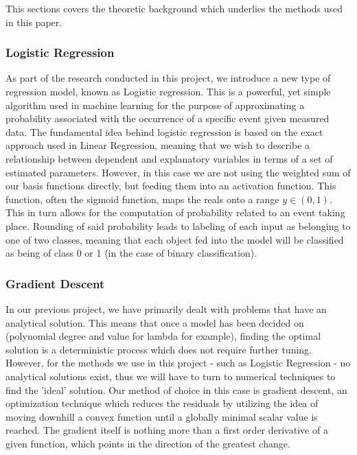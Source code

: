\documentclass[onecolumn,10pt,cleanfoot]{asme2ej}
\begin{document}
This sections covers the theoretic background which underlies the methods used in this paper.

\subsubsection{Logistic Regression}

As part of the research conducted in this project, we introduce a new type of regression model, known as Logistic regression. This is a powerful, yet simple algorithm used in machine learning for the purpose of approximating a probability associated with the occurrence of a specific event given measured data. The fundamental idea behind logistic regression is based on the exact approach used in Linear Regression, meaning that we wish to describe a relationship between dependent and explanatory variables in terms of a set of estimated parameters. However, in this case we are not using the weighted sum of our basis functions directly, but feeding them into an activation function. This function, often the sigmoid function, maps the reals onto a range $y \in (0,1)$. This in turn allows for the computation of probability related to an event taking place. Rounding of said probability leads to labeling of each input as belonging to one of two classes, meaning that each object fed into the model will be classified as being of class 0 or 1 (in the case of binary classification).

 

\subsubsection{Gradient Descent}

In our previous project, we have primarily dealt with problems that have an analytical solution. This means that once a model has been decided on (polynomial degree and value for lambda for example), finding the optimal solution is a deterministic process which does not require further tuning. However, for the methods we use in this project - such as Logistic Regression - no analytical solutions exist, thus we will have to turn to numerical techniques to find the 'ideal' solution. Our method of choice in this case is gradient descent, an optimization technique which reduces the residuals by utilizing the idea of moving downhill a convex function until a globally minimal scalar value is reached. The gradient itself is nothing more than a first order derivative of a given function, which points in the direction of the greatest change. 
\end{document}

